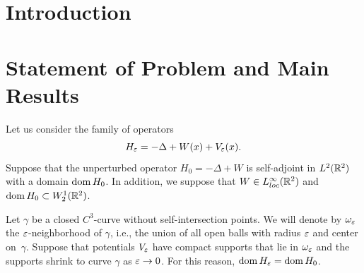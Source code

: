 




\section{Introduction  }
\label{Sec:Introduction}













\section{Statement of Problem and Main Results}
\label{Sec:Statment}

Let us consider the family of operators
\begin{equation}\label{OprHe}
H_\varepsilon=-\Delta +W(x)+V_\varepsilon(x).
\end{equation}
Suppose that the unperturbed operator $H_0=-\Delta +W$ is self-adjoint in $L^2(\mathbb R^2)$ with a domain $\mathop{\rm dom} H_0$. In addition, we suppose  that $W\in L^\infty_{loc}(\mathbb R^2)$ and  $\mathop{\rm dom} H_0\subset W_2^1(\mathbb R^2)$.

Let $\gamma$ be a  closed $C^3$-curve without self-intersection
points. We will denote by $\omega_\varepsilon$ the $\varepsilon$-neighborhood of $\gamma$, i.e., the union of all open balls with radius $\varepsilon$ and center on~$\gamma$.  Suppose that potentials $V_\varepsilon$ have compact supports that lie in $\omega_\varepsilon$ and  the supports  shrink to curve $\gamma$ as $\varepsilon\to 0$. For this reason, $\mathop{\rm dom} H_\varepsilon=\mathop{\rm dom} H_0$.


